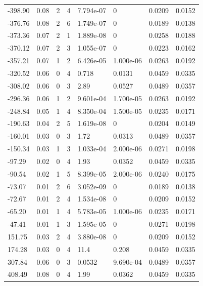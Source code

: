 \documentclass[preview]{standalone}
\begin{document}
{{\begin{tabular}{L{1.2cm}C{1.2cm} C{0.3cm}C{0.5cm} C{1.4cm}C{1.4cm} C{1.4cm}C{1.4cm}}
  -398.90  &  0.08  & 2     &  4 &  7.794e-07  & 0  & 0.0209 &  0.0152   \\ 
  -376.76  &  0.08  & 2     &  6 &  1.749e-07  & 0  & 0.0189 &  0.0138   \\ 
  -373.36  &  0.07  & 2     &  1 &  1.889e-08  & 0  & 0.0258 &  0.0188   \\ 
  -370.12  &  0.07  & 2     &  3 &  1.055e-07  & 0  & 0.0223 &  0.0162   \\ 
  -357.21  &  0.07  & 1     &  2 &  6.426e-05  & 1.000e-06  & 0.0263 &  0.0192   \\ 
  -320.52  &  0.06  & 0     &  4 &  0.718  & 0.0131  & 0.0459 &  0.0335   \\ 
  -308.02  &  0.06  & 0     &  3 &  2.89  & 0.0527  & 0.0489 &  0.0357   \\ 
  -296.36  &  0.06  & 1     &  2 &  9.601e-04  & 1.700e-05  & 0.0263 &  0.0192   \\ 
  -248.84  &  0.05  & 1     &  4 &  8.350e-04  & 1.500e-05  & 0.0235 &  0.0171   \\ 
  -190.63  &  0.04  & 2     &  5 &  1.619e-08  & 0  & 0.0204 &  0.0149   \\ 
  -160.01  &  0.03  & 0     &  3 &  1.72  & 0.0313  & 0.0489 &  0.0357   \\ 
  -150.34  &  0.03  & 1     &  3 &  1.033e-04  & 2.000e-06  & 0.0271 &  0.0198   \\ 
  -97.29  &  0.02  & 0     &  4 &  1.93  & 0.0352  & 0.0459 &  0.0335   \\ 
  -90.54  &  0.02  & 1     &  5 &  8.399e-05  & 2.000e-06  & 0.0240 &  0.0175   \\ 
  -73.07  &  0.01  & 2     &  6 &  3.052e-09  & 0  & 0.0189 &  0.0138   \\ 
  -72.67  &  0.01  & 2     &  4 &  1.534e-08  & 0  & 0.0209 &  0.0152   \\ 
  -65.20  &  0.01  & 1     &  4 &  5.783e-05  & 1.000e-06  & 0.0235 &  0.0171   \\ 
  -47.41  &  0.01  & 1     &  3 &  1.595e-05  & 0  & 0.0271 &  0.0198   \\ 
  151.75  &  0.03  & 2     &  4 &  3.880e-08  & 0  & 0.0209 &  0.0152   \\ 
  174.28  &  0.03  & 0     &  4 &  11.4  & 0.208  & 0.0459 &  0.0335   \\ 
  307.84  &  0.06  & 0     &  3 &  0.0532  & 9.690e-04  & 0.0489 &  0.0357   \\ 
  408.49  &  0.08  & 0     &  4 &  1.99  & 0.0362  & 0.0459 &  0.0335   \\ 

\end{tabular}}}
\end{document}
